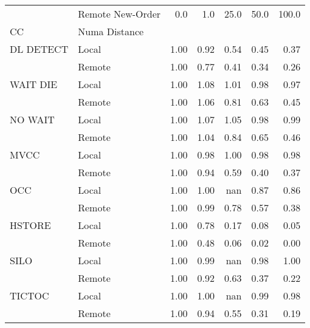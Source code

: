 \begin{tabular}{llrrrrr}
\toprule
       & Remote New-Order &  0.0   &  1.0   &  25.0  &  50.0  &  100.0 \\
CC & Numa Distance &        &        &        &        &        \\
\midrule
DL DETECT & Local &   1.00 &   0.92 &   0.54 &   0.45 &   0.37 \\
       & Remote &   1.00 &   0.77 &   0.41 &   0.34 &   0.26 \\
WAIT DIE & Local &   1.00 &   1.08 &   1.01 &   0.98 &   0.97 \\
       & Remote &   1.00 &   1.06 &   0.81 &   0.63 &   0.45 \\
NO WAIT & Local &   1.00 &   1.07 &   1.05 &   0.98 &   0.99 \\
       & Remote &   1.00 &   1.04 &   0.84 &   0.65 &   0.46 \\
MVCC & Local &   1.00 &   0.98 &   1.00 &   0.98 &   0.98 \\
       & Remote &   1.00 &   0.94 &   0.59 &   0.40 &   0.37 \\
OCC & Local &   1.00 &   1.00 &    nan &   0.87 &   0.86 \\
       & Remote &   1.00 &   0.99 &   0.78 &   0.57 &   0.38 \\
HSTORE & Local &   1.00 &   0.78 &   0.17 &   0.08 &   0.05 \\
       & Remote &   1.00 &   0.48 &   0.06 &   0.02 &   0.00 \\
SILO & Local &   1.00 &   0.99 &    nan &   0.98 &   1.00 \\
       & Remote &   1.00 &   0.92 &   0.63 &   0.37 &   0.22 \\
TICTOC & Local &   1.00 &   1.00 &    nan &   0.99 &   0.98 \\
       & Remote &   1.00 &   0.94 &   0.55 &   0.31 &   0.19 \\
\bottomrule
\end{tabular}
